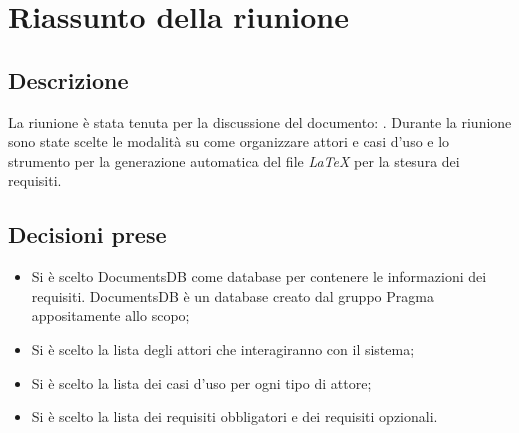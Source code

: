\section{Riassunto della riunione}
\subsection{Descrizione}

La riunione è stata tenuta per la discussione del documento: \AdR. Durante la riunione sono state scelte le modalità su come organizzare attori e casi d'uso e lo strumento per la generazione automatica del file \textit{\LaTeX {}} per la stesura dei requisiti.

\subsection{Decisioni prese}
\begin{itemize}
\item Si è scelto DocumentsDB come database per contenere le informazioni dei requisiti. DocumentsDB è un database creato dal gruppo Pragma appositamente allo scopo;
\item Si è scelto la lista degli attori che interagiranno con il sistema;
\item Si è scelto la lista dei casi d'uso per ogni tipo di attore;
\item Si è scelto la lista dei requisiti obbligatori e dei requisiti opzionali.
\end{itemize}